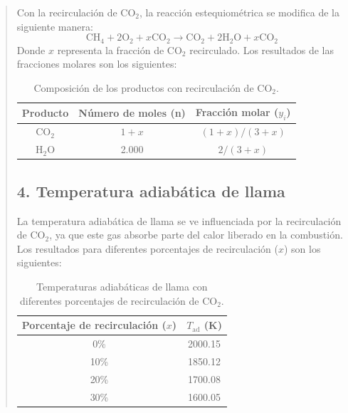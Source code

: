 \documentclass[11pt, a4paper]{article}
\begin{document}
\begin{quote}
\begin{center}
\begin{adjustwidth}{-1.7cm}{-1cm}
Con la recirculación de \(\text{CO}_2\), la reacción estequiométrica se modifica de la siguiente manera:
\begin{equation}
\text{CH}_4 + 2\text{O}_2 + x\text{CO}_2 \rightarrow \text{CO}_2 + 2\text{H}_2\text{O} + x\text{CO}_2
\end{equation}
Donde \(x\) representa la fracción de \(\text{CO}_2\) recirculado. Los resultados de las fracciones molares son los siguientes:

\begin{table}[H]
\centering
\begin{tabular}{|c|c|c|}
\hline
\textbf{Producto} & \textbf{Número de moles (n)} & \textbf{Fracción molar (\(y_i\))} \\ \hline
\(\text{CO}_2\)   & \(1 + x\)                    & \((1 + x) / (3 + x)\)            \\ \hline
\(\text{H}_2\text{O}\) & 2.000                        & \(2 / (3 + x)\)                  \\ \hline
\end{tabular}
\caption{Composición de los productos con recirculación de \(\text{CO}_2\).}
\label{tab:composicion_recirculacion}
\end{table}

\subsection*{4. Temperatura adiabática de llama}

La temperatura adiabática de llama se ve influenciada por la recirculación de \(\text{CO}_2\), ya que este gas absorbe parte del calor liberado en la combustión. Los resultados para diferentes porcentajes de recirculación (\(x\)) son los siguientes:

\begin{table}[H]
\centering
\begin{tabular}{|c|c|}
\hline
\textbf{Porcentaje de recirculación (\(x\))} & \textbf{\(T_{\text{ad}}\) (K)} \\ \hline
0\%                                         & 2000.15 \\ \hline
10\%                                        & 1850.12 \\ \hline
20\%                                        & 1700.08 \\ \hline
30\%                                        & 1600.05 \\ \hline
\end{tabular}
\caption{Temperaturas adiabáticas de llama con diferentes porcentajes de recirculación de \(\text{CO}_2\).}
\label{tab:temperatura_adiabatica_recirculacion}
\end{table}


\end{adjustwidth}
\end{center}
\end{quote}
\end{document}
